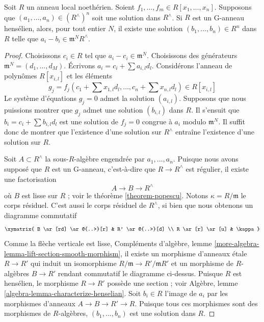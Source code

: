 \begin{theorem}
\label{theorem-approximation-property}
Soit $R$ un anneau local noethérien. Soient
$f_1, \ldots, f_m \in R[x_1, \ldots, x_n]$.
Supposons que $(a_1, \ldots, a_n) \in (R^\wedge)^n$ soit une solution
dans $R^\wedge$. Si $R$ est un G-anneau hensélien, alors, pour tout entier
$N$, il existe une solution $(b_1, \ldots, b_n) \in R^n$ dans $R$ telle que
$a_i - b_i \in \mathfrak m^NR^\wedge$.
\end{theorem}

\begin{proof}
Choisissons $c_i \in R$ tel que $a_i - c_i \in \mathfrak m^N$.
Choisissons des générateurs $\mathfrak m^N = (d_1, \ldots, d_M)$.
Écrivons $a_i = c_i + \sum a_{i, l} d_l$.
Considérons l'anneau de polynômes $R[x_{i, l}]$ et les éléments
$$
g_j = f_j(c_1 + \sum x_{1, l} d_l , \ldots, c_n + \sum x_{n, l} d_l)
\in R[x_{i, l}]
$$
Le système d'équations $g_j = 0$ admet la solution $(a_{i, l})$.
Supposons que nous puissions montrer que $g_j$ admet une solution
$(b_{i, l})$ dans $R$.
Il s'ensuit que $b_i = c_i + \sum b_{i, l}d_l$ est une solution
de $f_j = 0$ congrue à $a_i$ modulo $\mathfrak m^N$.
Il suffit donc de montrer que l'existence d'une solution sur $R^\wedge$
entraîne l'existence d'une solution sur $R$.

\medskip\noindent
Soit $A \subset R^\wedge$ la sous-$R$-algèbre engendrée par
$a_1, \ldots, a_n$. Puisque nous avons supposé que $R$ est un G-anneau,
c'est-à-dire que $R \to R^\wedge$ est régulier, il existe une factorisation
$$
A \to B \to R^\wedge
$$
où $B$ est lisse sur $R$ ; voir le théorème \ref{theorem-popescu}.
Notons $\kappa = R/\mathfrak m$ le corps résiduel. C'est aussi
le corps résiduel de $R^\wedge$, si bien que nous obtenons un diagramme
commutatif
$$
\xymatrix{
B \ar[rd] \ar@{..>}[r] & R' \ar@{..>}[d] \\
R \ar[r] \ar[u] & \kappa
}
$$
Comme la flèche verticale est lisse,
Compléments d'algèbre, lemme
\ref{more-algebra-lemma-lift-section-smooth-morphism},
il existe un morphisme d'anneaux \'etale $R \to R'$ qui induit un isomorphisme
$R/\mathfrak m \to R'/\mathfrak mR'$ et un morphisme de $R$-algèbres
$B \to R'$ rendant commutatif le diagramme ci-dessus.
Puisque $R$ est hensélien, le morphisme $R \to R'$ possède une section ; voir
Algèbre, lemme \ref{algebra-lemma-characterize-henselian}.
Soit $b_i \in R$ l'image de $a_i$ par les morphismes d'anneaux
$A \to B \to R' \to R$. Puisque tous ces morphismes sont des morphismes de
$R$-algèbres, $(b_1, \ldots, b_n)$ est une solution dans $R$.
\end{proof}

